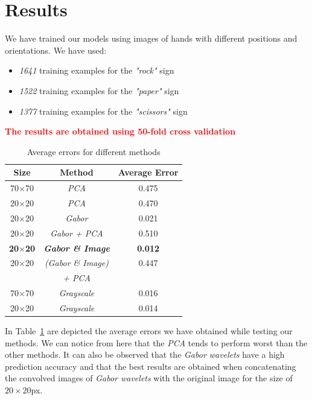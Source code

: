 \documentclass[a4paper, 11pt, twocolumn]{article}
\newcommand{\todo}[1]{\textcolor{red}{\textbf{#1}}}
\begin{document}
    \section{Results}
	\label{sec:results}
		We have trained our models using images of hands with different positions and orientations. We have used:
		\begin{itemize}
		\item \emph{1641} training examples for the \emph{"rock"} sign 
		\item \emph{1522} training examples for the \emph{"paper"} sign
		\item \emph{1377} training examples for the \emph{"scissors"} sign
		\end{itemize}
         \todo{The results are obtained using 50-fold cross validation}\\
		\begin{table}[!hbtp]
		\begin{tabular}{| c | c | c |}
			\hline\hline
			\textbf{Size} & \textbf{Method} & \textbf{Average Error}\\ 
			\hline\hline
			  70$\times$70 & \emph{PCA} & 0.475\\
			\hline
			  20$\times$20 & \emph{PCA} & 0.470\\
			\hline
			  20$\times$20 & \emph{Gabor} & 0.021\\
			\hline
			  20$\times$20 & \emph{Gabor + PCA} & 0.510\\
			\hline
			  \textbf{20$\times$20} & \textbf{\emph{Gabor \& Image}} & \textbf{0.012}\\
		 	\hline
			  20$\times$20 & \emph{(Gabor \& Image)} & 0.447\\
		               & \emph {+ PCA}  &     \\ 			
			\hline
			  70$\times$70 & \emph{Grayscale} & 0.016\\
			\hline
			  20$\times$20 & \emph{Grayscale} & 0.014\\
			\hline
		\end{tabular}
		\caption{Average errors for different methods}
		\label{tab:res}
		\end{table}
		\hspace*{10px}In Table~\ref{tab:res} are depicted the average errors we have obtained while testing our methods. We can notice from here that the \emph{PCA} tends to perform worst than the other methods. It can also be observed that the \emph{Gabor wavelets} have a high prediction accuracy and that the best results are obtained when concatenating the convolved images of \emph{Gabor wavelets} with the original image for the size of \emph{$20\times20$}px.  
\end{document}
